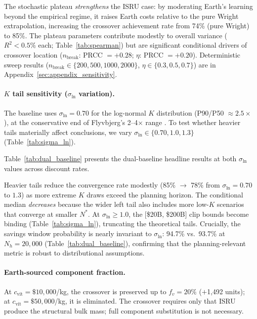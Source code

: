 The stochastic plateau \emph{strengthens} the ISRU case: by moderating Earth's learning beyond the empirical regime, it raises Earth costs relative to the pure Wright extrapolation, increasing the crossover achievement rate from 74\% (pure Wright) to 85\%. The plateau parameters contribute modestly to overall variance ($R^2 < 0.5\%$ each; Table~\ref{tab:spearman}) but are significant conditional drivers of crossover location ($n_{\mathrm{break}}$: PRCC $= +0.28$; $\eta$: PRCC $= +0.20$). Deterministic sweep results ($n_{\mathrm{break}} \in \{200,500,1000,2000\}$, $\eta \in \{0.3,0.5,0.7\}$) are in Appendix~\ref{sec:appendix_sensitivity}.

\paragraph{$K$ tail sensitivity ($\sigma_{\ln}$ variation).} The baseline uses $\sigma_{\ln} = 0.70$ for the log-normal $K$ distribution (P90/P50 $\approx 2.5\times$), at the conservative end of Flyvbjerg's 2--4$\times$ range \cite{flyvbjerg2014}. To test whether heavier tails materially affect conclusions, we vary $\sigma_{\ln} \in \{0.70, 1.0, 1.3\}$ (Table~\ref{tab:sigma_ln}).


Table~\ref{tab:dual_baseline} presents the dual-baseline headline results at both $\sigma_{\ln}$ values across discount rates.


Heavier tails reduce the convergence rate modestly (85\% $\to$ 78\% from $\sigma_{\ln} = 0.70$ to $1.3$) as more extreme $K$ draws exceed the planning horizon. The conditional median \emph{decreases} because the wider left tail also includes more low-$K$ scenarios that converge at smaller $N^*$. At $\sigma_{\ln} \geq 1.0$, the [\$20B, \$200B] clip bounds become binding (Table~\ref{tab:sigma_ln}), truncating the theoretical tails. Crucially, the savings window probability is nearly invariant to $\sigma_{\ln}$: 94.7\% vs.\ 93.7\% at $N_h = 20{,}000$ (Table~\ref{tab:dual_baseline}), confirming that the planning-relevant metric is robust to distributional assumptions.

\paragraph{Earth-sourced component fraction.} At $c_{\mathrm{vit}} = \$10{,}000$/kg, the crossover is preserved up to $f_v = 20\%$ ($+$1{,}492 units); at $c_{\mathrm{vit}} = \$50{,}000$/kg, it is eliminated. The crossover requires only that ISRU produce the structural bulk mass; full component substitution is not necessary.

